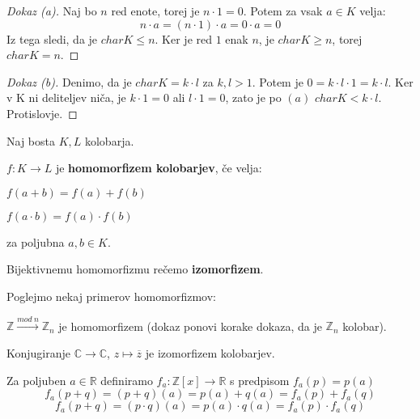 \documentclass[11pt, a4paper]{article}
\begin{document}
    \begin{proof}[Dokaz \emph{(a)}]
        Naj bo \(n\) red enote, torej je \(n \cdot 1 = 0\). Potem za vsak \(a \in K\) velja:
        \[n \cdot a = (n \cdot 1) \cdot a = 0 \cdot a = 0\]
        Iz tega sledi, da je \(char K \le n\). Ker je red \(1\) enak \(n\), je \(char K \ge n\), torej \(char K = n\).
    \end{proof}

    \begin{proof}[Dokaz \emph{(b)}]
            Denimo, da je \(char K = k \cdot l\) za \(k,l > 1\). Potem je \(0 = k \cdot l \cdot 1 = k \cdot l\). Ker v K ni deliteljev niča, je \(k \cdot 1 = 0\) ali \(l \cdot 1 = 0\), zato je po \((a)\) \(char K < k \cdot l\). Protislovje.
    \end{proof}

    \begin{definition}
        Naj bosta \(K,L\) kolobarja.
        \par
        \(f:K \rightarrow L\) je \textbf{homomorfizem kolobarjev}, če velja:
        \begin{center}
            \(f(a + b) = f(a) + f(b)\)
        \end{center}
        \begin{center}
            \(f(a \cdot b) = f(a) \cdot f(b)\)
        \end{center}
        za poljubna \(a,b \in K\).
    \end{definition}

    Bijektivnemu homomorfizmu rečemo \textbf{izomorfizem}.
    \par
    Poglejmo nekaj primerov homomorfizmov:

    \begin{example}
        \(\mathbb{Z} \xrightarrow{mod\ n} \mathbb{Z}_n\) je homomorfizem (dokaz ponovi korake dokaza, da je \(\mathbb{Z}_n\) kolobar).
    \end{example}

    \begin{example}
        Konjugiranje \(\mathbb{C} \to \mathbb{C}\), \(z \mapsto \overline{z}\) je izomorfizem kolobarjev.
    \end{example}

    \begin{example}
        Za poljuben \(a \in \mathbb{R}\) definiramo \(f_a: \mathbb{Z}[x] \rightarrow \mathbb{R}\) s predpisom \(f_a(p) = p(a)\)
        \[f_a(p + q) = (p + q)(a) = p(a) + q(a) = f_a(p) + f_a(q)\]
        \[f_a(p + q) = (p \cdot q)(a) = p(a) \cdot q(a) = f_a(p) \cdot f_a(q)\]
    \end{example}
\end{document}
